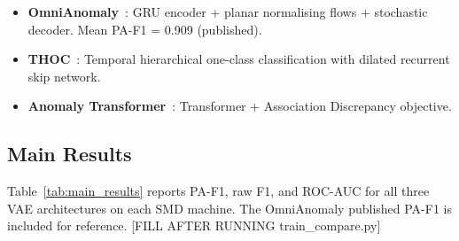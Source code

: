 \documentclass[10pt,twocolumn]{article}
\begin{document}
\begin{itemize}
  \item \textbf{OmniAnomaly}~\cite{su2019robust}: GRU encoder + planar
        normalising flows + stochastic decoder. Mean PA-F1 = 0.909 (published).
  \item \textbf{THOC}~\cite{shen2020timeseries}: Temporal hierarchical one-class
        classification with dilated recurrent skip network.
  \item \textbf{Anomaly Transformer}~\cite{xu2022anomaly}: Transformer + Association
        Discrepancy objective.
\end{itemize}

\subsection{Main Results}

Table~\ref{tab:main_results} reports PA-F1, raw F1, and ROC-AUC for all three
VAE architectures on each SMD machine. The OmniAnomaly published PA-F1 is
included for reference. [FILL AFTER RUNNING train\_compare.py]
\end{document}
